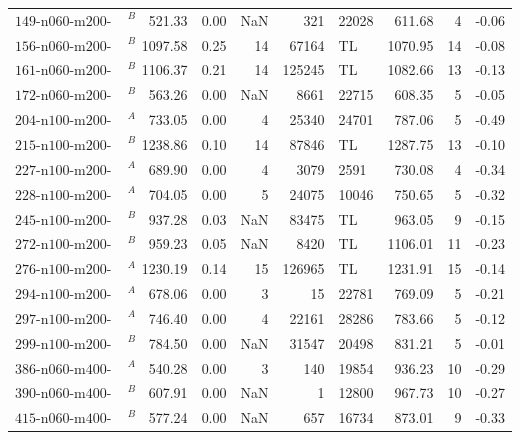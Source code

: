 \begin{table}
\begin{tabular}{lrrrrlrrr}
        $\text{149-n060-m200-bt100}^B$ & 521.33  & 0.00 & NaN   & 321    & 22028 & 611.68  & 4     & -0.06        \\
        $\text{156-n060-m200-bt10}^B$  & 1097.58 & 0.25 & 14    & 67164  & TL    & 1070.95 & 14    & -0.08        \\
        $\text{161-n060-m200-bt100}^B$ & 1106.37 & 0.21 & 14    & 125245 & TL    & 1082.66 & 13    & -0.13        \\
        $\text{172-n060-m200-bt10}^B$  & 563.26  & 0.00 & NaN   & 8661   & 22715 & 608.35  & 5     & -0.05        \\
        $\text{204-n100-m200-bt10}^A$  & 733.05  & 0.00 & 4     & 25340  & 24701 & 787.06  & 5     & -0.49        \\
        $\text{215-n100-m200-bt3}^B$   & 1238.86 & 0.10 & 14    & 87846  & TL    & 1287.75 & 13    & -0.10        \\
        $\text{227-n100-m200-bt3}^A$   & 689.90  & 0.00 & 4     & 3079   & 2591  & 730.08  & 4     & -0.34        \\
        $\text{228-n100-m200-bt3}^A$   & 704.05  & 0.00 & 5     & 24075  & 10046 & 750.65  & 5     & -0.32        \\
        $\text{245-n100-m200-bt3}^B$   & 937.28  & 0.03 & NaN   & 83475  & TL    & 963.05  & 9     & -0.15        \\
        $\text{272-n100-m200-bt3}^B$   & 959.23  & 0.05 & NaN   & 8420   & TL    & 1106.01 & 11    & -0.23        \\
        $\text{276-n100-m200-bt10}^A$  & 1230.19 & 0.14 & 15    & 126965 & TL    & 1231.91 & 15    & -0.14        \\
        $\text{294-n100-m200-bt10}^A$  & 678.06  & 0.00 & 3     & 15     & 22781 & 769.09  & 5     & -0.21        \\
        $\text{297-n100-m200-bt100}^A$ & 746.40  & 0.00 & 4     & 22161  & 28286 & 783.66  & 5     & -0.12        \\
        $\text{299-n100-m200-bt100}^B$ & 784.50  & 0.00 & NaN   & 31547  & 20498 & 831.21  & 5     & -0.01        \\
        $\text{386-n060-m400-bt100}^A$ & 540.28  & 0.00 & 3     & 140    & 19854 & 936.23  & 10    & -0.29        \\
        $\text{390-n060-m400-bt100}^B$ & 607.91  & 0.00 & NaN   & 1      & 12800 & 967.73  & 10    & -0.27        \\
        $\text{415-n060-m400-bt10}^B$  & 577.24  & 0.00 & NaN   & 657    & 16734 & 873.01  & 9     & -0.33        \\

\end{tabular}
\end{table}
